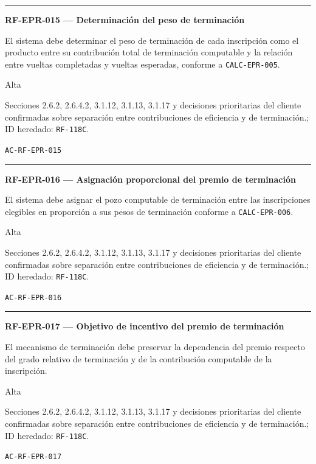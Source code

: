\documentclass[10pt,letterpaper]{article}
\begin{document}
\vspace{0.25em}\hrule\vspace{0.65em}
\noindent\textbf{RF-EPR-015 --- Determinación del peso de terminación}\par
\begin{description}[style=nextline,leftmargin=3.15cm,labelwidth=2.8cm,font=\normalfont\bfseries]
\item[Obligación] El sistema debe determinar el peso de terminación de cada inscripción como el producto entre su contribución total de terminación computable y la relación entre vueltas completadas y vueltas esperadas, conforme a \texttt{CALC-EPR-005}.
\item[Prioridad] Alta
\item[Procedencia] Secciones 2.6.2, 2.6.4.2, 3.1.12, 3.1.13, 3.1.17 y decisiones prioritarias del cliente confirmadas sobre separación entre contribuciones de eficiencia y de terminación.; ID heredado: \texttt{RF-118C}.
\item[Verificación] \texttt{AC-RF-EPR-015}
\end{description}
\vspace{0.25em}\hrule\vspace{0.65em}
\noindent\textbf{RF-EPR-016 --- Asignación proporcional del premio de terminación}\par
\begin{description}[style=nextline,leftmargin=3.15cm,labelwidth=2.8cm,font=\normalfont\bfseries]
\item[Obligación] El sistema debe asignar el pozo computable de terminación entre las inscripciones elegibles en proporción a sus pesos de terminación conforme a \texttt{CALC-EPR-006}.
\item[Prioridad] Alta
\item[Procedencia] Secciones 2.6.2, 2.6.4.2, 3.1.12, 3.1.13, 3.1.17 y decisiones prioritarias del cliente confirmadas sobre separación entre contribuciones de eficiencia y de terminación.; ID heredado: \texttt{RF-118C}.
\item[Verificación] \texttt{AC-RF-EPR-016}
\end{description}
\vspace{0.25em}\hrule\vspace{0.65em}
\noindent\textbf{RF-EPR-017 --- Objetivo de incentivo del premio de terminación}\par
\begin{description}[style=nextline,leftmargin=3.15cm,labelwidth=2.8cm,font=\normalfont\bfseries]
\item[Obligación] El mecanismo de terminación debe preservar la dependencia del premio respecto del grado relativo de terminación y de la contribución computable de la inscripción.
\item[Prioridad] Alta
\item[Procedencia] Secciones 2.6.2, 2.6.4.2, 3.1.12, 3.1.13, 3.1.17 y decisiones prioritarias del cliente confirmadas sobre separación entre contribuciones de eficiencia y de terminación.; ID heredado: \texttt{RF-118C}.
\item[Verificación] \texttt{AC-RF-EPR-017}
\end{description}
\end{document}
